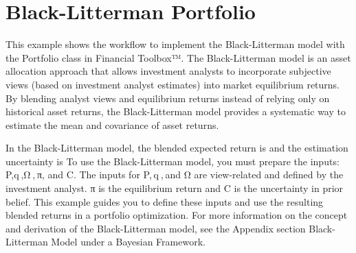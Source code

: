 %
%

%

\section{Black-Litterman Portfolio}
\label{sec:black-litterman}
This example shows the workflow to implement the Black-Litterman model with the Portfolio class in Financial Toolbox™. The Black-Litterman model is an asset allocation approach that allows investment analysts to incorporate subjective views (based on investment analyst estimates) into market equilibrium returns. By blending analyst views and equilibrium returns instead of relying only on historical asset returns, the Black-Litterman model provides a systematic way to estimate the mean and covariance of asset returns.

In the Black-Litterman model, the blended expected return is 
and the estimation uncertainty is
To use the Black-Litterman model, you must prepare the inputs: P,q ,Ω , π, and C. The inputs for P, q , and Ω are view-related and defined by the investment analyst. π is the equilibrium return and C is the uncertainty in prior belief. This example guides you to define these inputs and use the resulting blended returns in a portfolio optimization. For more information on the concept and derivation of the Black-Litterman model, see the Appendix section Black-Litterman Model under a Bayesian Framework.

